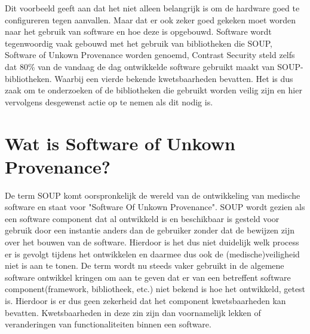 Dit voorbeeld geeft aan dat het niet alleen belangrijk is om de hardware goed te configureren tegen aanvallen.
Maar dat er ook zeker goed gekeken moet worden naar het gebruik van software en hoe deze is opgebouwd.
Software wordt tegenwoordig vaak gebouwd met het gebruik van bibliotheken die SOUP, Software of Unkown Provenance worden genoemd, Contrast Security steld zelfs dat 80\% van de vandaag de dag ontwikkelde software gebruikt maakt van SOUP-bibliotheken.
Waarbij een vierde bekende kwetsbaarheden bevatten.
Het is dus zaak om te onderzoeken of de bibliotheken die gebruikt worden veilig zijn en hier vervolgens desgewenst actie op te nemen als dit nodig is.

\section{Wat is Software of Unkown Provenance?}\label{sec:wat-is-soup?}
De term SOUP komt oorspronkelijk de wereld van de ontwikkeling van medische software en staat voor "Software Of Unkown Provenance".
SOUP wordt gezien als een software component dat al ontwikkeld is en beschikbaar is gesteld voor gebruik door een instantie anders dan de gebruiker zonder dat de bewijzen zijn over het bouwen van de software.
Hierdoor is het dus niet duidelijk welk process er is gevolgt tijdens het ontwikkelen en daarmee dus ook de (medische)veiligheid niet is aan te tonen.
De term wordt nu steeds vaker gebruikt in de algemene software ontwikkel kringen om aan te geven dat er van een betreffent software component(framework, bibliotheek, etc.) niet bekend is hoe het ontwikkeld, getest is.
Hierdoor is er dus geen zekerheid dat het component kwetsbaarheden kan bevatten.
Kwetsbaarheden in deze zin zijn dan voornamelijk lekken of veranderingen van functionaliteiten binnen een software.


